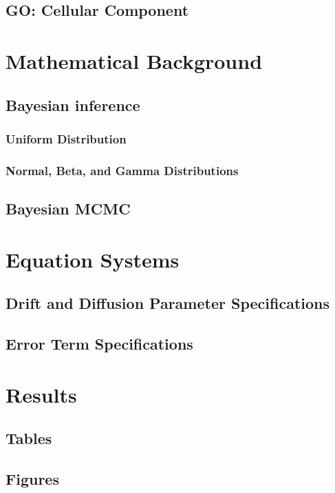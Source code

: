 \subsection{GO: Cellular Component}

\section{Mathematical Background}

\subsection{Bayesian inference}

\subsubsection{Uniform Distribution}

\subsubsection{Normal, Beta, and Gamma Distributions}

\subsection{Bayesian MCMC}

\section{Equation Systems}

\subsection{Drift and Diffusion Parameter Specifications}

\subsection{Error Term Specifications}

\section{Results}

\subsection{Tables}

\subsection{Figures}


